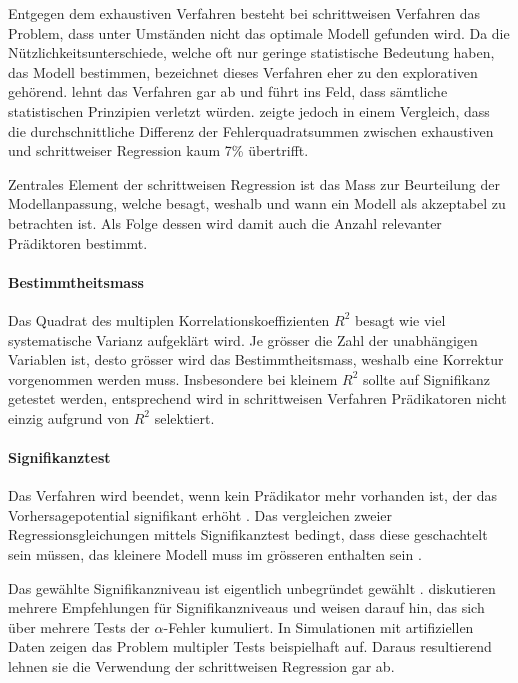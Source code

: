 \documentclass[english,12pt,doc]{apa}
\begin{document}
Entgegen dem exhaustiven Verfahren besteht bei schrittweisen Verfahren das Problem, dass unter Umständen nicht das optimale Modell gefunden wird. 
Da die Nützlichkeitsunterschiede, welche oft nur geringe statistische Bedeutung haben, das Modell bestimmen, bezeichnet  dieses Verfahren eher zu den explorativen gehörend. 
 lehnt das Verfahren gar ab und führt ins Feld, dass sämtliche statistischen Prinzipien verletzt würden. 
 zeigte jedoch in einem Vergleich, dass die durchschnittliche Differenz der Fehlerquadratsummen zwischen exhaustiven und schrittweiser Regression kaum 7\% übertrifft. 

Zentrales Element der schrittweisen Regression ist das Mass zur Beurteilung der  Modellanpassung, welche besagt, weshalb und wann ein Modell als akzeptabel zu betrachten ist. 
Als Folge dessen wird damit auch die Anzahl relevanter Prädiktoren bestimmt.

\paragraph{Bestimmtheitsmass}  Das Quadrat des multiplen Korrelationskoeffizienten $R^2$ besagt wie viel systematische Varianz aufgeklärt wird. 
Je grösser die Zahl der unabhängigen Variablen ist, desto grösser wird das Bestimmtheitsmass, weshalb eine Korrektur vorgenommen werden muss. 
Insbesondere bei kleinem $R^2$ sollte auf Signifikanz getestet werden, entsprechend wird in schrittweisen Verfahren Prädikatoren nicht einzig aufgrund von $R^2$ selektiert. 

\paragraph{Signifikanztest} Das Verfahren wird beendet, wenn kein Prädikator mehr vorhanden ist, der das Vorhersagepotential signifikant erhöht \cite[p.48]{bendel1977comparison}. 
Das vergleichen zweier Regressionsgleichungen mittels Signifikanztest bedingt, dass diese geschachtelt sein müssen, das kleinere Modell muss im grösseren enthalten sein \cite[p. 508]{jacob2003applied}.

Das gewählte Signifikanzniveau ist eigentlich unbegründet gewählt \cite[p. 174]{weakliem2004introduction}.  diskutieren mehrere Empfehlungen für Signifikanzniveaus und weisen darauf hin, das sich über mehrere Tests der $\alpha$-Fehler kumuliert. 
In  Simulationen mit artifiziellen Daten zeigen  das  Problem multipler Tests beispielhaft auf. 
Daraus resultierend lehnen sie die Verwendung der schrittweisen Regression gar ab.
\end{document}
